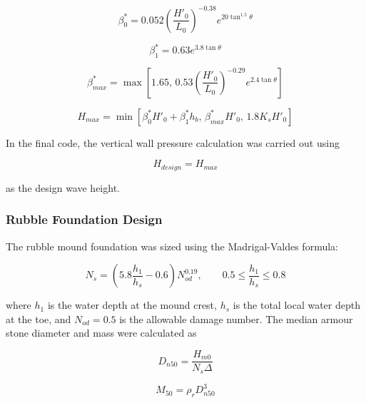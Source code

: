 \documentclass[a4paper, 11pt]{article}
\begin{document}
\begin{equation}
    \beta_0^*
    =
    0.052
    \left(\frac{H'_0}{L_0}\right)^{-0.38}
    e^{20\tan^{1.5}\theta}
\end{equation}

\begin{equation}
    \beta_1^*
    =
    0.63e^{3.8\tan\theta}
\end{equation}

\begin{equation}
    \beta_{max}^*
    =
    \max\left[
    1.65,\,
    0.53
    \left(\frac{H'_0}{L_0}\right)^{-0.29}
    e^{2.4\tan\theta}
    \right]
\end{equation}

\begin{equation}
    H_{max}
    =
    \min\left[
    \beta_0^*H'_0+\beta_1^*h_b,\,
    \beta_{max}^*H'_0,\,
    1.8K_sH'_0
    \right]
\end{equation}

In the final code, the vertical wall pressure calculation was carried out using

\begin{equation}
    H_{design}=H_{max}
\end{equation}

as the design wave height.

\subsubsection{Rubble Foundation Design}

\hspace*{0.5cm} The rubble mound foundation was sized using the Madrigal-Valdes formula:

\begin{equation}
    N_s=
    \left(5.8\frac{h_1}{h_s}-0.6\right)N_{od}^{0.19},
    \qquad
    0.5\leq\frac{h_1}{h_s}\leq0.8
\end{equation}

where \(h_1\) is the water depth at the mound crest, \(h_s\) is the total local water depth at the toe, and \(N_{od}=0.5\) is the allowable damage number. The median armour stone diameter and mass were calculated as

\begin{equation}
    D_{n50}=\frac{H_{m0}}{N_s\Delta}
\end{equation}

\begin{equation}
    M_{50}=\rho_rD_{n50}^3
\end{equation}
\end{document}
